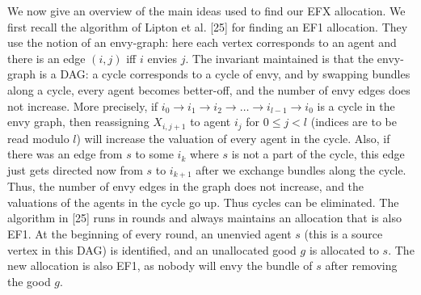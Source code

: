 \documentclass{article}
\begin{document}
We now give an overview of the main ideas used to find our EFX allocation. We first recall the algorithm of Lipton et al. [25] for finding an EF1 allocation. They use the notion of an envy-graph: here each vertex corresponds to an agent and there is an edge $(i, j)$ iff $i$ envies $j$. The invariant maintained is that the envy-graph is a DAG: a cycle corresponds to a cycle of envy, and by swapping bundles along a cycle, every agent becomes better-off, and the number of envy edges does not increase. More precisely, if $i_0 \rightarrow i_1 \rightarrow i_2 \rightarrow \ldots \rightarrow i_{l-1} \rightarrow i_0$ is a cycle in the envy graph, then reassigning $X_{i,j+1}$ to agent $i_j$ for $0 \leq j < l $ (indices are to be read modulo $l$) will increase the valuation of every agent in the cycle. Also, if there was an edge from $s$ to some $i_k$ where $s$ is not a part of the cycle, this edge just gets directed now from $s$ to $i_{k+1}$ after we exchange bundles along the cycle. Thus, the number of envy edges in the graph does not increase, and the valuations of the agents in the cycle go up. Thus cycles can be eliminated. The algorithm in [25] runs in rounds and always maintains an allocation that is also EF1. At the beginning of every round, an unenvied agent $s$ (this is a source vertex in this DAG) is identified, and an unallocated good $g$ is allocated to $s$. The new allocation is also EF1, as nobody will envy the bundle of $s$ after removing the good $g$.
\end{document}
